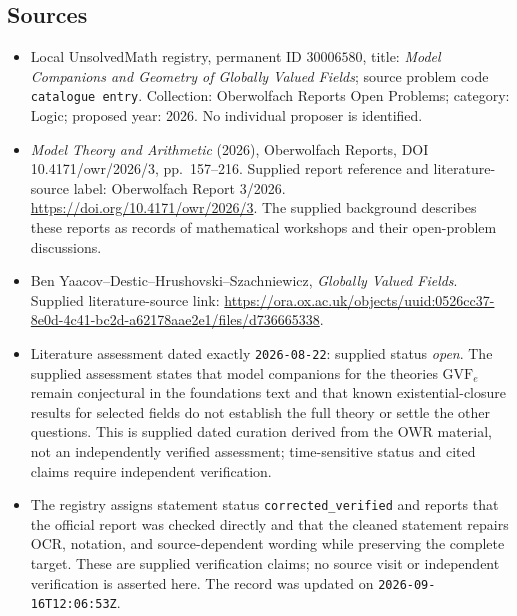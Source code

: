 \documentclass[11pt]{article}
\begin{document}
\subsection{Sources}
\begin{itemize}
\item Local UnsolvedMath registry, permanent ID \(30006580\), title: \emph{Model Companions and Geometry of Globally Valued Fields}; source problem code \texttt{catalogue entry}. Collection: Oberwolfach Reports Open Problems; category: Logic; proposed year: 2026. No individual proposer is identified.
\item \emph{Model Theory and Arithmetic} (2026), Oberwolfach Reports, DOI 10.4171/owr/2026/3, pp.\ 157--216. Supplied report reference and literature-source label: Oberwolfach Report 3/2026. \url{https://doi.org/10.4171/owr/2026/3}. The supplied background describes these reports as records of mathematical workshops and their open-problem discussions.
\item Ben Yaacov--Destic--Hrushovski--Szachniewicz, \emph{Globally Valued Fields}. Supplied literature-source link: \url{https://ora.ox.ac.uk/objects/uuid:0526cc37-8e0d-4c41-bc2d-a62178aae2e1/files/d736665338}.
\item Literature assessment dated exactly \texttt{2026-08-22}: supplied status \emph{open}. The supplied assessment states that model companions for the theories \(\mathrm{GVF}_e\) remain conjectural in the foundations text and that known existential-closure results for selected fields do not establish the full theory or settle the other questions. This is supplied dated curation derived from the OWR material, not an independently verified assessment; time-sensitive status and cited claims require independent verification.
\item The registry assigns statement status \texttt{corrected\_verified} and reports that the official report was checked directly and that the cleaned statement repairs OCR, notation, and source-dependent wording while preserving the complete target. These are supplied verification claims; no source visit or independent verification is asserted here. The record was updated on \texttt{2026-09-16T12:06:53Z}.
\end{itemize}
\end{document}
